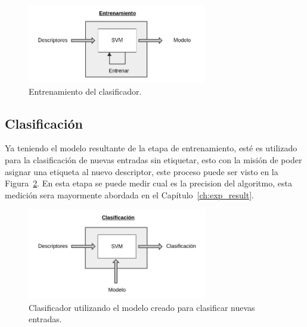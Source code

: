 		
	\begin{figure}[bt]
		\centering
  		\label{algoritmo:fig:entrenamiento}
    		\includegraphics[width=0.7\textwidth]{Figuras/Diagramas/Entrenamiento.png}
  		\caption{Entrenamiento del clasificador.}
	\end{figure}	
		
		
	\subsection{Clasificación}
	\label{algoritmo:clasificacion}
		Ya teniendo el modelo resultante de la etapa de entrenamiento, esté es utilizado para la clasificación de nuevas entradas sin etiquetar, esto con la misión de poder asignar una etiqueta al nuevo descriptor, este proceso puede ser visto en la Figura~\ref{algoritmo:fig:clasificacion}. En esta etapa se puede medir cual es la precision del algoritmo, esta medición sera mayormente abordada en el Capítulo~\ref{ch:exp_result}.
		
	
	\begin{figure}[bt]
		\centering
  		\label{algoritmo:fig:clasificacion}
    		\includegraphics[width=0.7\textwidth]{Figuras/Diagramas/Clasificacion.png}
  		\caption{Clasificador utilizando el modelo creado para clasificar nuevas entradas.}
	\end{figure}	
		
	
	
	
	
	